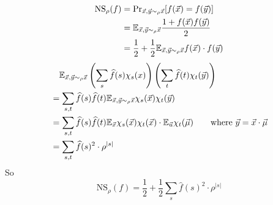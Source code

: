 \[\begin{aligned}
    \mathrm{NS}_\rho(f)&=\mathrm{Pr}_{\vec{x},\vec{y}\sim_\rho \vec{x}}[f(\vec{x})=f(\vec{y})]\\
    &=\mathbb E_{\vec{x},\vec{y}\sim_\rho \vec{x}}\frac{1+f(\vec{x})f(\vec{y})}{2}\\
    &=\frac{1}{2}+\frac{1}{2}\mathbb E_{\vec{x},\vec{y}\sim_\rho\vec{x}}f(\vec{x})\cdot f(\vec{y})
\end{aligned}\]
\[\begin{aligned}
    &\quad\mathbb E_{\vec{x},\vec{y}\sim_\rho\vec{x}}\left(\sum_{s}\widehat{f}(s)\chi_s(x)\right)\left(\sum_t\widehat{f}(t)\chi_t(\vec{y})\right)\\
    &=\sum_{s,t}\widehat{f}(s)\widehat{f}(t)\mathbb E_{\vec{x},\vec{y}\sim_\rho\vec{x}}\chi_s(\vec{x})\chi_t(\vec{y})\\
    &=\sum_{s,t}\widehat{f}(s)\widehat{f}(t)\mathbb E_{\vec{x}}\chi_s(\vec{x})\chi_t(\vec{x})\cdot\mathbb E_{\vec{u}}\chi_t(\vec{\mu})\qquad\text{where  $ \vec{y}=\vec{x}\cdot \vec{\mu} $}\\
    &=\sum_{s,t}\widehat{f}(s)^2\cdot\rho^{|s|}
\end{aligned}\]
So 
\[\mathrm{NS}_\rho(f)=\frac{1}{2}+\frac{1}{2}\sum_s\hat{f}(s)^2\cdot \rho^{|s|}\]